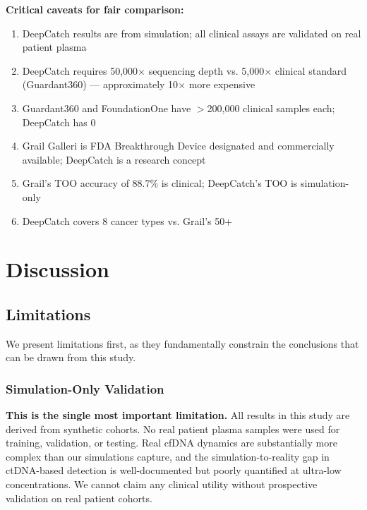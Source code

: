\documentclass[10pt,a4paper]{article}
\begin{document}
\textbf{Critical caveats for fair comparison:}
\begin{enumerate}[nosep]
\item DeepCatch results are from simulation; all clinical assays are validated on real patient plasma
\item DeepCatch requires 50,000$\times$ sequencing depth vs. 5,000$\times$ clinical standard (Guardant360) — approximately 10$\times$ more expensive
\item Guardant360 and FoundationOne have $>$200,000 clinical samples each; DeepCatch has 0
\item Grail Galleri is FDA Breakthrough Device designated and commercially available; DeepCatch is a research concept
\item Grail's TOO accuracy of 88.7\% is clinical; DeepCatch's TOO is simulation-only
\item DeepCatch covers 8 cancer types vs. Grail's 50+
\end{enumerate}


\section{Discussion}

\subsection{Limitations}

We present limitations first, as they fundamentally constrain the conclusions that can be drawn from this study.

\subsubsection{Simulation-Only Validation}

\textbf{This is the single most important limitation.} All results in this study are derived from synthetic cohorts. No real patient plasma samples were used for training, validation, or testing. Real cfDNA dynamics are substantially more complex than our simulations capture, and the simulation-to-reality gap in ctDNA-based detection is well-documented but poorly quantified at ultra-low concentrations. We cannot claim any clinical utility without prospective validation on real patient cohorts.
\end{document}
